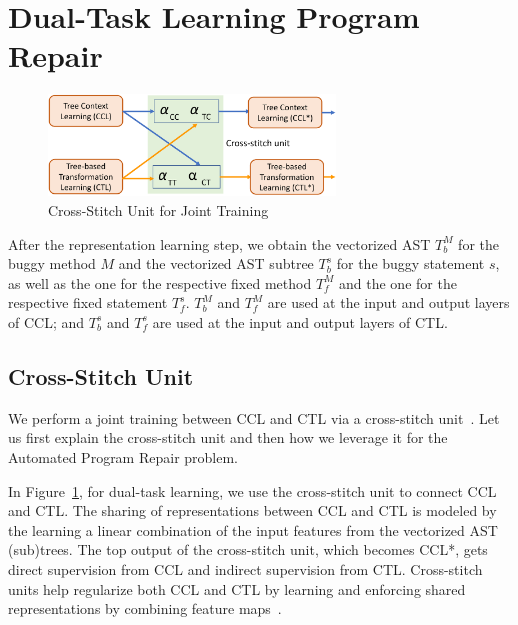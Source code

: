 \section{Dual-Task Learning Program Repair}
\label{sec: dual-learning}
\begin{figure}[t]
	\centering
	\includegraphics[width=3in]{graphs/cross-stitch}
        \vspace{-9pt}
	\caption{Cross-Stitch Unit for Joint Training~\cite{misra2016cross}}
	\label{fig:cross-stitch}
\end{figure}

After the representation learning step, we obtain the vectorized AST
$T^{M}_b$ for the buggy method $M$ and the vectorized AST subtree
$T^{s}_b$ for the buggy statement $s$, as well as the one for the
respective fixed method $T^{M}_f$ and the one for the respective fixed
statement $T^{s}_f$. $T^{M}_b$ and $T^{M}_f$ are used at the input and
output layers of CCL; and $T^{s}_b$ and $T^{s}_f$ are used at the
input and output layers of CTL.



\subsection{Cross-Stitch Unit}

We perform a joint training between CCL and CTL via a cross-stitch
unit~\cite{misra2016cross}. Let us first explain the cross-stitch unit
and then how we leverage it for the Automated Program Repair problem.



In Figure~\ref{fig:cross-stitch}, for dual-task learning, we use the
cross-stitch unit to connect CCL and CTL. The sharing of
representations between CCL and CTL is modeled by the learning a
linear combination of the input features from the vectorized AST
(sub)trees. The top output of the cross-stitch unit, which becomes
CCL*, gets direct supervision from CCL and indirect supervision from
CTL. Cross-stitch units help regularize both CCL and CTL by learning
and enforcing shared representations by combining feature
maps~\cite{misra2016cross}.

